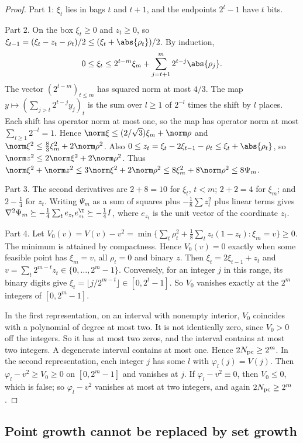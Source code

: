 \begin{proof}
Part 1: $\xi_t$ lies in bags $t$ and $t+1$, and the endpoints $2^t-1$ have
$t$ bits.

Part 2. On the box $\xi_t\ge0$ and $z_t\ge0$, so
$\xi_{t-1}=(\xi_t-z_t-\rho_t)/2\le(\xi_t+\abs{\rho_t})/2$. By induction,
\[
0\le\xi_t\le2^{t-m}\xi_m+\sum_{j=t+1}^m2^{t-j}\abs{\rho_j} .
\]
The vector $(2^{t-m})_{t\le m}$ has squared norm at most $4/3$. The map
$y\mapsto(\sum_{j>t}2^{t-j}y_j)_t$ is the sum over $l\ge1$ of $2^{-l}$ times
the shift by $l$ places. Each shift has operator norm at most one, so the map
has operator norm at most $\sum_{l\ge1}2^{-l}=1$. Hence
$\norm\xi\le(2/\sqrt3)\xi_m+\norm\rho$ and
$\norm\xi^2\le\frac83\xi_m^2+2\norm\rho^2$. Also
$0\le z_t=\xi_t-2\xi_{t-1}-\rho_t\le\xi_t+\abs{\rho_t}$, so
$\norm z^2\le2\norm\xi^2+2\norm\rho^2$. Thus
$\norm\xi^2+\norm z^2\le3\norm\xi^2+2\norm\rho^2\le8\xi_m^2+8\norm\rho^2
\le8\Psi_m$.

Part 3. The second derivatives are $2+8=10$ for $\xi_t$, $t<m$; $2+2=4$ for
$\xi_m$; and $2-\frac14$ for $z_t$. Writing $\Psi_m$ as a sum of squares plus
$-\frac18\sum z_t^2$ plus linear terms gives
$\nabla^2\Psi_m\succeq-\frac14\sum_te_{z_t}e_{z_t}^{\T}\succeq-\frac14I$,
where $e_{z_t}$ is the unit vector of the coordinate $z_t$.

Part 4. Let $V_0(v)=V(v)-v^2
=\min\{\sum_t\rho_t^2+\frac18\sum_tz_t(1-z_t):\xi_m=v\}\ge0$. The minimum is
attained by compactness. Hence $V_0(v)=0$ exactly when some feasible point
has $\xi_m=v$, all $\rho_t=0$ and binary $z$. Then $\xi_t=2\xi_{t-1}+z_t$ and
$v=\sum_t2^{m-t}z_t\in\{0,\ldots,2^m-1\}$. Conversely, for an integer $j$ in
this range, its binary digits give $\xi_t=\lfloor j/2^{m-t}\rfloor\in
[0,2^t-1]$. So $V_0$ vanishes exactly at the $2^m$ integers of
$[0,2^m-1]$.

In the first representation, on an interval with nonempty interior,
$V_0$ coincides with a polynomial of degree at most two. It is not
identically zero, since $V_0>0$ off the integers. So it has at most two
zeros, and the interval contains at most two integers. A degenerate interval
contains at most one. Hence $2N_{\rm pc}\ge2^m$. In the second
representation, each integer $j$ has some $l$ with $\varphi_l(j)=V(j)$. Then
$\varphi_l-v^2\ge V_0\ge0$ on $[0,2^m-1]$ and vanishes at $j$. If
$\varphi_l-v^2\equiv0$, then $V_0\le0$, which is false; so $\varphi_l-v^2$
vanishes at most at two integers, and again $2N_{\rm pc}\ge2^m$.
\end{proof}

\subsection{Point growth cannot be replaced by set growth}
\label{sec:limits-setgrowth}

